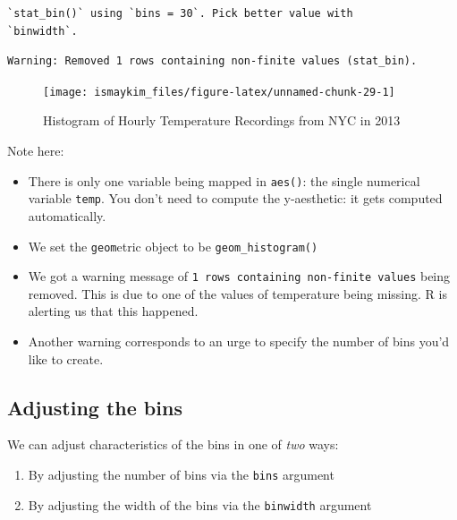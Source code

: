 \documentclass[12pt,]{krantz}
\providecommand{\tightlist}{%
  \setlength{\itemsep}{0pt}\setlength{\parskip}{0pt}}
\begin{document}
\begin{verbatim}
`stat_bin()` using `bins = 30`. Pick better value with
`binwidth`.
\end{verbatim}

\begin{verbatim}
Warning: Removed 1 rows containing non-finite values (stat_bin).
\end{verbatim}

\begin{figure}

{\centering \texttt{[image: ismaykim\_files/figure-latex/unnamed-chunk-29-1]} 

}

\caption{Histogram of Hourly Temperature Recordings from NYC in 2013}\label{fig:unnamed-chunk-29}
\end{figure}

Note here:

\begin{itemize}
\tightlist
\item
  There is only one variable being mapped in \texttt{aes()}: the single
  numerical variable \texttt{temp}. You don't need to compute the
  y-aesthetic: it gets computed automatically.
\item
  We set the \texttt{geom}etric object to be \texttt{geom\_histogram()}
\item
  We got a warning message of
  \texttt{1\ rows\ containing\ non-finite\ values} being removed. This
  is due to one of the values of temperature being missing. R is
  alerting us that this happened.\\
\item
  Another warning corresponds to an urge to specify the number of bins
  you'd like to create.
\end{itemize}

\subsection{Adjusting the bins}\label{adjustbins}

We can adjust characteristics of the bins in one of \emph{two} ways:

\begin{enumerate}
\def\labelenumi{\arabic{enumi}.}
\tightlist
\item
  By adjusting the number of bins via the \texttt{bins} argument
\item
  By adjusting the width of the bins via the \texttt{binwidth} argument
\end{enumerate}
\end{document}
